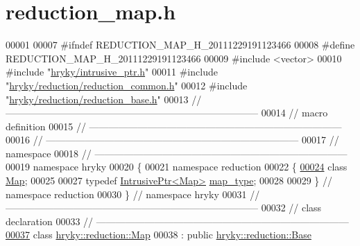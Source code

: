 \hypertarget{reduction__map_8h_source}{\section{reduction\-\_\-map.\-h}
}

\begin{DoxyCode}
00001 
00007 \textcolor{preprocessor}{#ifndef REDUCTION\_MAP\_H\_20111229191123466}
00008 \textcolor{preprocessor}{}\textcolor{preprocessor}{#define REDUCTION\_MAP\_H\_20111229191123466}
00009 \textcolor{preprocessor}{}\textcolor{preprocessor}{#include <vector>}
00010 \textcolor{preprocessor}{#include "\hyperlink{intrusive__ptr_8h}{hryky/intrusive_ptr.h}"}
00011 \textcolor{preprocessor}{#include "\hyperlink{reduction__common_8h}{hryky/reduction/reduction_common.h}"}
00012 \textcolor{preprocessor}{#include "\hyperlink{reduction__base_8h}{hryky/reduction/reduction_base.h}"}
00013 \textcolor{comment}{//
      ------------------------------------------------------------------------------}
00014 \textcolor{comment}{// macro definition}
00015 \textcolor{comment}{//
      ------------------------------------------------------------------------------}
00016 \textcolor{comment}{//
      ------------------------------------------------------------------------------}
00017 \textcolor{comment}{// namespace}
00018 \textcolor{comment}{//
      ------------------------------------------------------------------------------}
00019 \textcolor{keyword}{namespace }hryky
00020 \{
00021 \textcolor{keyword}{namespace }reduction
00022 \{
\hypertarget{reduction__map_8h_source_l00024}{}\hyperlink{namespacehryky_1_1reduction_a64228de3f2cff9ed9d5ad836a120c7f7}{00024}     \textcolor{keyword}{class }\hyperlink{classhryky_1_1reduction_1_1_map}{Map};
00025 
00027     \textcolor{keyword}{typedef} \hyperlink{classhryky_1_1_intrusive_ptr}{IntrusivePtr<Map>} \hyperlink{namespacehryky_1_1reduction_a64228de3f2cff9ed9d5ad836a120c7f7}{map_type};
00028 
00029 \} \textcolor{comment}{// namespace reduction}
00030 \} \textcolor{comment}{// namespace hryky}
00031 \textcolor{comment}{//
      ------------------------------------------------------------------------------}
00032 \textcolor{comment}{// class declaration}
00033 \textcolor{comment}{//
      ------------------------------------------------------------------------------}
\hypertarget{reduction__map_8h_source_l00037}{}\hyperlink{classhryky_1_1reduction_1_1_map}{00037} \textcolor{comment}{}\textcolor{keyword}{class }\hyperlink{classhryky_1_1reduction_1_1_map}{hryky::reduction::Map}
00038     : \textcolor{keyword}{public} \hyperlink{classhryky_1_1reduction_1_1_base}{hryky::reduction::Base}

\end{DoxyCode}
